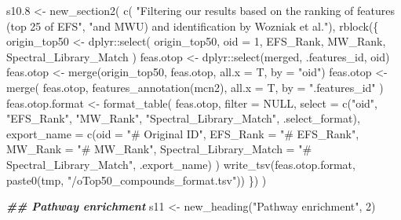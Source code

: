 \documentclass[
]{article}
\newenvironment{Shaded}{\begin{snugshade}}{\end{snugshade}}
\newcommand{\AttributeTok}[1]{\textcolor[rgb]{0.77,0.63,0.00}{#1}}
\newcommand{\ConstantTok}[1]{\textcolor[rgb]{0.00,0.00,0.00}{#1}}
\newcommand{\DecValTok}[1]{\textcolor[rgb]{0.00,0.00,0.81}{#1}}
\newcommand{\DocumentationTok}[1]{\textcolor[rgb]{0.56,0.35,0.01}{\textbf{\textit{#1}}}}
\newcommand{\FloatTok}[1]{\textcolor[rgb]{0.00,0.00,0.81}{#1}}
\newcommand{\FunctionTok}[1]{\textcolor[rgb]{0.00,0.00,0.00}{#1}}
\newcommand{\NormalTok}[1]{#1}
\newcommand{\OtherTok}[1]{\textcolor[rgb]{0.56,0.35,0.01}{#1}}
\newcommand{\SpecialCharTok}[1]{\textcolor[rgb]{0.00,0.00,0.00}{#1}}
\newcommand{\StringTok}[1]{\textcolor[rgb]{0.31,0.60,0.02}{#1}}
\begin{document}
\begin{Shaded}
\begin{Highlighting}[]
\NormalTok{s10}\FloatTok{.8} \OtherTok{\textless{}{-}} \FunctionTok{new\_section2}\NormalTok{(}
  \FunctionTok{c}\NormalTok{( }\StringTok{"Filtering our results based on the ranking of \textquotesingle{}features\textquotesingle{} (top 25 of EFS"}\NormalTok{,}
      \StringTok{"and MWU) and identification by Wozniak et al."}\NormalTok{),}
  \FunctionTok{rblock}\NormalTok{(\{}
\NormalTok{    origin\_top50 }\OtherTok{\textless{}{-}}\NormalTok{ dplyr}\SpecialCharTok{::}\FunctionTok{select}\NormalTok{(}
\NormalTok{      origin\_top50, }\AttributeTok{oid =} \DecValTok{1}\NormalTok{, EFS\_Rank, MW\_Rank,}
\NormalTok{      Spectral\_Library\_Match}
\NormalTok{    )}
\NormalTok{    feas.otop }\OtherTok{\textless{}{-}}\NormalTok{ dplyr}\SpecialCharTok{::}\FunctionTok{select}\NormalTok{(merged, .features\_id, oid)}
\NormalTok{    feas.otop }\OtherTok{\textless{}{-}} \FunctionTok{merge}\NormalTok{(origin\_top50, feas.otop, }\AttributeTok{all.x =}\NormalTok{ T, }\AttributeTok{by =} \StringTok{"oid"}\NormalTok{)}
\NormalTok{    feas.otop }\OtherTok{\textless{}{-}} \FunctionTok{merge}\NormalTok{(}
\NormalTok{      feas.otop, }\FunctionTok{features\_annotation}\NormalTok{(mcn2),}
      \AttributeTok{all.x =}\NormalTok{ T, }\AttributeTok{by =} \StringTok{".features\_id"}
\NormalTok{    )}
\NormalTok{    feas.otop.format }\OtherTok{\textless{}{-}} \FunctionTok{format\_table}\NormalTok{(}
\NormalTok{      feas.otop, }\AttributeTok{filter =} \ConstantTok{NULL}\NormalTok{,}
      \AttributeTok{select =} \FunctionTok{c}\NormalTok{(}\StringTok{"oid"}\NormalTok{, }\StringTok{"EFS\_Rank"}\NormalTok{, }\StringTok{"MW\_Rank"}\NormalTok{, }\StringTok{"Spectral\_Library\_Match"}\NormalTok{, .select\_format),}
      \AttributeTok{export\_name =} \FunctionTok{c}\NormalTok{(}\AttributeTok{oid =} \StringTok{"\# Original ID"}\NormalTok{, }\AttributeTok{EFS\_Rank =} \StringTok{"\# EFS\_Rank"}\NormalTok{,}
        \AttributeTok{MW\_Rank =} \StringTok{"\# MW\_Rank"}\NormalTok{,}
        \AttributeTok{Spectral\_Library\_Match =} \StringTok{"\# Spectral\_Library\_Match"}\NormalTok{,}
\NormalTok{        .export\_name)}
\NormalTok{    )}
    \FunctionTok{write\_tsv}\NormalTok{(feas.otop.format, }\FunctionTok{paste0}\NormalTok{(tmp, }\StringTok{"/oTop50\_compounds\_format.tsv"}\NormalTok{))}
\NormalTok{  \})}
\NormalTok{)}

\DocumentationTok{\#\# Pathway enrichment }
\NormalTok{s11 }\OtherTok{\textless{}{-}} \FunctionTok{new\_heading}\NormalTok{(}\StringTok{"Pathway enrichment"}\NormalTok{, }\DecValTok{2}\NormalTok{)}


\end{Highlighting}
\end{Shaded}
\end{document}
